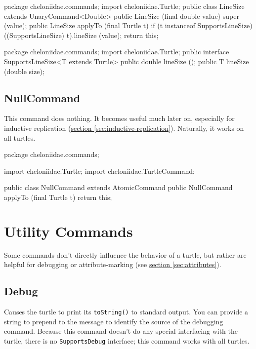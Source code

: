 \documentclass{report}
\newcommand{\Ref}[2]{\hyperref[#2]{#1 \ref*{#2}}}
\begin{document}
\begin{javacode}
package cheloniidae.commands;
import cheloniidae.Turtle;
public class LineSize extends UnaryCommand<Double> {
  public LineSize (final double value) {super (value);}
  public LineSize applyTo (final Turtle t) {
    if (t instanceof SupportsLineSize) ((SupportsLineSize) t).lineSize (value);
    return this;
  }
}
\end{javacode}

\begin{javacode}
package cheloniidae.commands;
import cheloniidae.Turtle;
public interface SupportsLineSize<T extends Turtle> {
  public double lineSize ();
  public T      lineSize (double size);
}
\end{javacode}

\subsection {NullCommand} \label{sec:nullcommand}
        This command does nothing. It becomes useful much later on, especially for inductive replication (\Ref{section}{sec:inductive-replication}). Naturally,
        it works on all turtles.

\begin{javacode}
package cheloniidae.commands;

import cheloniidae.Turtle;
import cheloniidae.TurtleCommand;

public class NullCommand extends AtomicCommand {
  public NullCommand applyTo (final Turtle t) {return this;}
}
\end{javacode}

\section {Utility Commands} \label{sec:utility-commands}
      Some commands don't directly influence the behavior of a turtle, but rather are helpful for debugging or attribute-marking (see
      \Ref{section}{sec:attributes}).

\subsection {Debug} \label{sec:debug}
        Causes the turtle to print its {\tt toString()} to standard output. You can provide a string to prepend to the message to identify the source of the
        debugging command. Because this command doesn't do any special interfacing with the turtle, there is no {\tt SupportsDebug} interface; this command
        works with all turtles.
\end{document}
